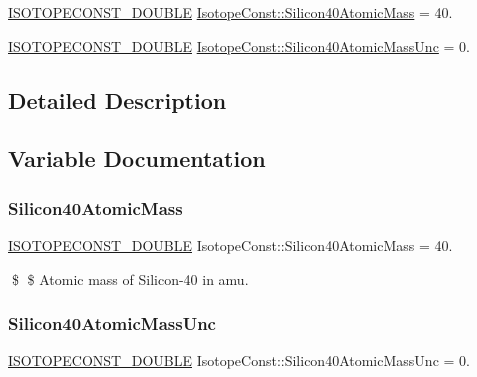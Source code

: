 \begin{DoxyCompactItemize}
\item 
\mbox{\hyperlink{group___isotope_const-_macros_ga8f45a7272ce02c0b4c65c44636ed719a}{I\+S\+O\+T\+O\+P\+E\+C\+O\+N\+S\+T\+\_\+\+D\+O\+U\+B\+LE}} \mbox{\hyperlink{group___isotope_const-_silicon-_si40_ga0a803a1b3de5237292e1cdc20274a76e}{Isotope\+Const\+::\+Silicon40\+Atomic\+Mass}} = 40.
\item 
\mbox{\hyperlink{group___isotope_const-_macros_ga8f45a7272ce02c0b4c65c44636ed719a}{I\+S\+O\+T\+O\+P\+E\+C\+O\+N\+S\+T\+\_\+\+D\+O\+U\+B\+LE}} \mbox{\hyperlink{group___isotope_const-_silicon-_si40_ga9fdeea6587379b579329f0ff86c6ee89}{Isotope\+Const\+::\+Silicon40\+Atomic\+Mass\+Unc}} = 0.
\end{DoxyCompactItemize}


\subsection{Detailed Description}


\subsection{Variable Documentation}
\mbox{\label{group___isotope_const-_silicon-_si40_ga0a803a1b3de5237292e1cdc20274a76e}} 
\subsubsection{\texorpdfstring{Silicon40\+Atomic\+Mass}{Silicon40AtomicMass}}
{\footnotesize\ttfamily \mbox{\hyperlink{group___isotope_const-_macros_ga8f45a7272ce02c0b4c65c44636ed719a}{I\+S\+O\+T\+O\+P\+E\+C\+O\+N\+S\+T\+\_\+\+D\+O\+U\+B\+LE}} Isotope\+Const\+::\+Silicon40\+Atomic\+Mass = 40.}

\$ \$ Atomic mass of Silicon-\/40 in amu. \mbox{\label{group___isotope_const-_silicon-_si40_ga9fdeea6587379b579329f0ff86c6ee89}} 
\subsubsection{\texorpdfstring{Silicon40\+Atomic\+Mass\+Unc}{Silicon40AtomicMassUnc}}
{\footnotesize\ttfamily \mbox{\hyperlink{group___isotope_const-_macros_ga8f45a7272ce02c0b4c65c44636ed719a}{I\+S\+O\+T\+O\+P\+E\+C\+O\+N\+S\+T\+\_\+\+D\+O\+U\+B\+LE}} Isotope\+Const\+::\+Silicon40\+Atomic\+Mass\+Unc = 0.}

